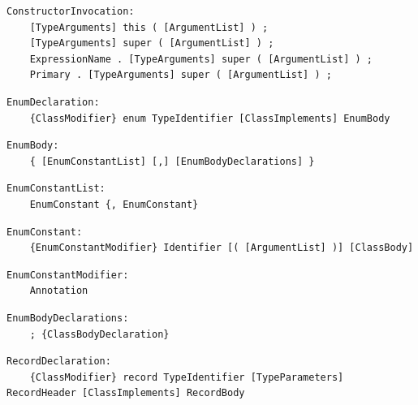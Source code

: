 \noindent\textbf{\texttt{}}\par
\begin{lstlisting}
ConstructorInvocation:
    [TypeArguments] this ( [ArgumentList] ) ;
    [TypeArguments] super ( [ArgumentList] ) ;
    ExpressionName . [TypeArguments] super ( [ArgumentList] ) ;
    Primary . [TypeArguments] super ( [ArgumentList] ) ;
\end{lstlisting}

\noindent\textbf{\texttt{}}\par
\begin{lstlisting}
EnumDeclaration:
    {ClassModifier} enum TypeIdentifier [ClassImplements] EnumBody
\end{lstlisting}

\noindent\textbf{\texttt{}}\par
\begin{lstlisting}
EnumBody:
    { [EnumConstantList] [,] [EnumBodyDeclarations] }
\end{lstlisting}

\noindent\textbf{\texttt{}}\par
\begin{lstlisting}
EnumConstantList:
    EnumConstant {, EnumConstant}
\end{lstlisting}

\noindent\textbf{\texttt{}}\par
\begin{lstlisting}
EnumConstant:
    {EnumConstantModifier} Identifier [( [ArgumentList] )] [ClassBody]
\end{lstlisting}

\noindent\textbf{\texttt{}}\par
\begin{lstlisting}
EnumConstantModifier:
    Annotation
\end{lstlisting}

\noindent\textbf{\texttt{}}\par
\begin{lstlisting}
EnumBodyDeclarations:
    ; {ClassBodyDeclaration}
\end{lstlisting}

\noindent\textbf{\texttt{}}\par
\begin{lstlisting}
RecordDeclaration:
    {ClassModifier} record TypeIdentifier [TypeParameters] RecordHeader [ClassImplements] RecordBody
\end{lstlisting}

